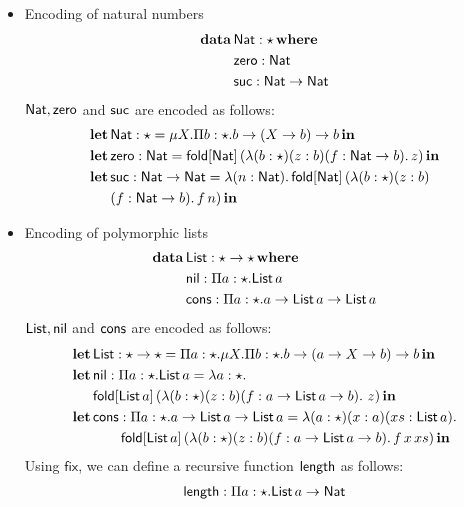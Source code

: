 \begin{itemize}
\item Encoding of natural numbers
  \begin{align*}
    \mathbf{data}\,&\mathsf{Nat} : \star\,\mathbf{where} \\
           &\mathsf{zero} : \mathsf{Nat} \\
           &\mathsf{suc} : \mathsf{Nat} \rightarrow \mathsf{Nat}
  \end{align*}
  $\mathsf{Nat},\mathsf{zero}$ and $\mathsf{suc}$ are encoded as follows:
  \begin{align*}
    \mathbf{let}\,&\mathsf{Nat} : \star = \mu X.\Pi b:\star.b \rightarrow (X \rightarrow b) \rightarrow b\,\mathbf{in} \\
    \mathbf{let}\,&\mathsf{zero} : \mathsf{Nat} = \mathsf{fold}[\mathsf{Nat}]\,(\lambda (b : \star) (z : b) (f : \mathsf{Nat} \rightarrow b).\,z)\,\mathbf{in} \\
    \mathbf{let}\,&\mathsf{suc} : \mathsf{Nat} \rightarrow \mathsf{Nat} = \lambda (n : \mathsf{Nat}).\,\mathsf{fold}[\mathsf{Nat}]\,(\lambda (b : \star) (z : b)\\ &(f : \mathsf{Nat} \rightarrow b).\,f\,n)\,\mathbf{in}
  \end{align*}
\item Encoding of polymorphic lists
  \begin{align*}
    \mathbf{data}\,&\mathsf{List} : \star \rightarrow \star\,\mathbf{where} \\
           &\mathsf{nil} : \Pi a:\star.\mathsf{List}\,a \\
           &\mathsf{cons} : \Pi a:\star.a \rightarrow \mathsf{List}\,a \rightarrow \mathsf{List}\,a
  \end{align*}
  $\mathsf{List},\mathsf{nil}$ and $\mathsf{cons}$ are encoded as follows:
  \begin{align*}
    \mathbf{let}\,&\mathsf{List} : \star \rightarrow \star = \Pi a:\star.\mu X.\Pi b:\star.b \rightarrow (a \rightarrow X \rightarrow b) \rightarrow b\,\mathbf{in} \\
    \mathbf{let}\,&\mathsf{nil} : \Pi a:\star.\mathsf{List}\,a = \lambda a : \star.\\
            &\mathsf{fold}[\mathsf{List}\,a]\,(\lambda (b : \star) (z : b) (f : a \rightarrow \mathsf{List}\,a \rightarrow b).\ z)\,\mathbf{in} \\
    \mathbf{let}\,&\mathsf{cons} : \Pi a:\star.a \rightarrow \mathsf{List}\,a \rightarrow \mathsf{List}\,a = \lambda(a:\star)(x : a)(xs : \mathsf{List}\,a).\\
            &\qquad \mathsf{fold}[\mathsf{List}\,a]\,(\lambda(b : \star)(z : b)(f : a \rightarrow \mathsf{List}\,a \rightarrow b).\,f\,x\,xs)\,\mathbf{in}
  \end{align*}
  Using $\mathsf{fix}$, we can define a recursive function $\mathsf{length}$
  as follows:
  \begin{align*}
    \length &: \pai{a}{\star}{\List\,a \rightarrow \Nat} \\

\end{align*}
\end{itemize}
